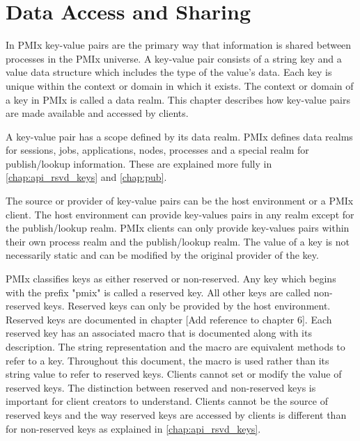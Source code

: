 \chapter{Data Access and Sharing}
\label{chap:data_sharing}

In \ac{PMIx} key-value pairs are the primary way that information is shared 
between processes in the \ac{PMIx} universe.  
A key-value pair consists of a string key and a value data structure
which includes the type of the value's data.  
Each key is unique within the context or domain in which it exists.
The context or domain of a key in PMIx is called a data realm.  
This chapter describes how key-value pairs are made available and accessed by clients.

A key-value pair has a scope defined by its data realm.  
PMIx defines data realms for sessions, jobs, applications, nodes, processes and a special 
realm for publish/lookup information.   
These are explained more fully in \ref{chap:api_rsvd_keys} and \ref{chap:pub}.

The source or provider of key-value pairs can be the host environment or a \ac{PMIx} client.  
The host environment can provide key-values pairs in any realm except for the publish/lookup realm.
PMIx clients can only provide key-values pairs within their own process realm and the publish/lookup realm.
The value of a key is not necessarily static and can be modified by the original provider of the key.

\ac{PMIx} classifies keys as either reserved or non-reserved.
Any key which begins with the prefix "pmix" is called a reserved key.
All other keys are called non-reserved keys.
Reserved keys can only be provided by the host environment.  
Reserved keys are documented in chapter [Add reference to chapter 6].   
Each reserved key has an associated macro that is documented along with its description.  
The string representation and the macro are equivalent methods to refer to a key.
Throughout this document, the macro is used rather than its string value to refer to reserved keys.
Clients cannot set or modify the value of reserved keys.
The distinction between reserved and non-reserved keys is important for client creators to understand.
Clients cannot be the source of reserved keys and the way reserved keys are accessed by clients 
is different than for non-reserved keys as explained in \ref{chap:api_rsvd_keys}.

